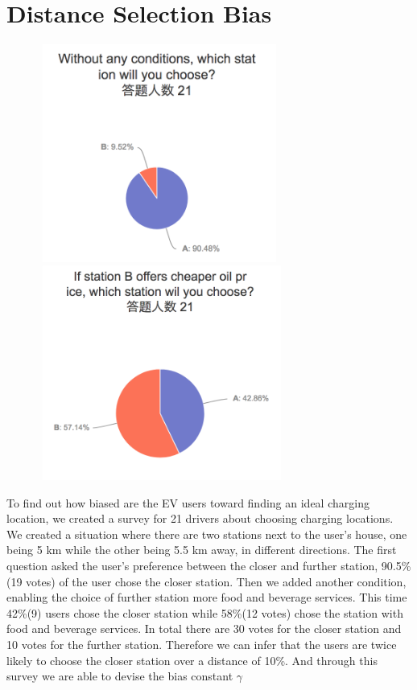 \documentclass[10pt]{article}
\begin{document}
\section{Distance Selection Bias} \label{survey}
\begin{figure}[htbp]
    \begin{minipage}[t]{0.5\textwidth}
        \centering
        \includegraphics[width=225pt,height=203pt]{Survey1.png}
    \end{minipage}
    \begin{minipage}[t]{0.5\textwidth}
        \centering
        \includegraphics[width=230pt,height=200pt]{Survey2.png}
    \end{minipage}
    \label{fig:density_plot}
\end{figure}
To find out how biased are the EV users toward finding an ideal charging location, we created a survey for 21 drivers about choosing charging locations. We created a situation where there are two stations next to the user's house, one being 5 km while the other being 5.5 km away, in different directions. The first question asked the user's preference between the closer and further station, 90.5\%(19 votes) of the user chose the closer station. Then we added another condition, enabling the choice of further station more food and beverage services. This time 42\%(9) users chose the closer station while 58\%(12 votes) chose the station with food and beverage services. In total there are 30 votes for the closer station and 10 votes for the further station. Therefore we can infer that the users are twice likely to choose the closer station over a distance of 10\%. And through this survey we are able to devise the bias constant $\gamma$
\end{document}
